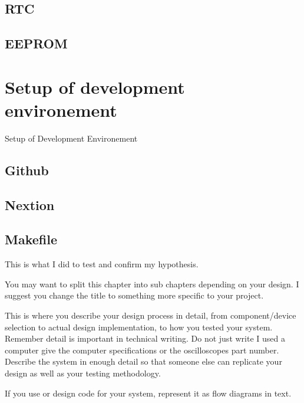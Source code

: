 \subsection{RTC}
\subsection{EEPROM}


\section{Setup of development environement}
Setup of Development Environement
\subsection{Github}
\subsection{Nextion}
\subsection{Makefile}

This is what I did to test and confirm my hypothesis.


You may want to split this chapter into sub chapters depending on your design. I suggest you change
the title to something more specific to your project.

This is where you describe your design process in detail, from component/device selection to actual
design implementation, to how you tested your system. Remember detail is important in technical
writing. Do not just write I used a computer give the computer specifications or the oscilloscopes part
number. Describe the system in enough detail so that someone else can replicate your design as well
as your testing methodology.

If you use or design code for your system, represent it as flow diagrams in text.
